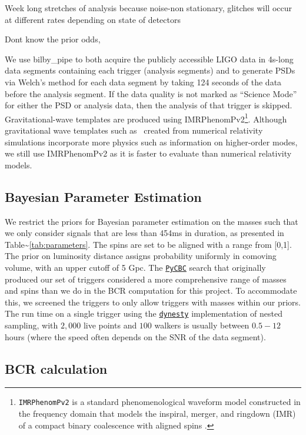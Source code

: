 \documentclass[%
 reprint,
 amsmath,amssymb,
 aps,
]{revtex4}
\newcommand{\bilbypipe}{{\sc bilby\_pipe}\xspace}
\newcommand{\imrphenomp}{{\sc IMRPhenomPv2}\xspace}
\begin{document}
Week long stretches of analysis because noise-non stationary, glitches will occur at different rates depending on state of detectors 


Dont know the prior odds, 


We use \bilbypipe to both acquire the publicly accessible LIGO data in 4s-long data segments containing each trigger (analysis segments) and to generate PSDs via Welch's method for each data segment by taking 124 seconds of the data before the analysis segment. If the data quality is not marked as ``Science Mode'' for either the PSD or analysis data, then the analysis of that trigger is skipped. Gravitational-wave templates
are produced using \imrphenomp \footnote{\texttt{IMRPhenomPv2} is a standard phenomenological waveform model constructed in the
  frequency domain that models the inspiral, merger, and ringdown (IMR) of a compact binary coalescence with aligned spins
  \citep{khan2016frequency}.}. Although gravitational wave templates such as \ created from numerical relativity simulations
incorporate more physics such as information on higher-order modes, we still use \imrphenomp as it is faster to evaluate than numerical
relativity models.

\hypertarget{bayesian-parameter-estimation}{%
\subsection{Bayesian Parameter Estimation}\label{bayesian-parameter-estimation}}

We restrict the priors for Bayesian parameter estimation on the masses such that we only consider signals that are less
than 454ms in duration, as presented in Table\textasciitilde\ref{tab:parameters}. The spins are set to be aligned with a range from
{[}0,1{]}. The prior on luminosity distance assigns probability uniformly in comoving volume, with an upper cutoff of 5 Gpc.
The \href{https://pycbc.org/}{\texttt{PyCBC}} search that originally produced our set of triggers considered a more comprehensive range of masses and
spins than we do in the BCR computation for this project. To accommodate this, we screened the triggers to only allow
triggers with masses within our priors. The run time on a single trigger using the \href{https://arxiv.org/abs/1904.02180}{\texttt{dynesty}} implementation of nested
sampling, with \(2,000\) live points and \(100\) walkers is usually between \(0.5-12\) hours (where the speed often depends on
the SNR of the data segment).

\hypertarget{bcrCalculation}{%
\subsection{BCR calculation}\label{bcrCalculation}}
\end{document}

